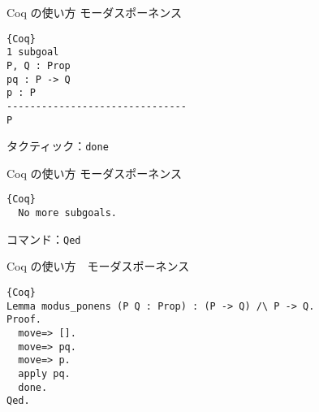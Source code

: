 \documentclass[dvipdfmx,cjk]{beamer}
\theoremstyle{mystyle}
\newcommand{\0}{\textbf{0}}
\begin{document}
\begin{frame}[fragile]{Coq の使い方 モーダスポーネンス}
	\begin{screen}
	  \begin{lstlisting}{Coq}
1 subgoal
P, Q : Prop
pq : P -> Q
p : P
-------------------------------
P \end{lstlisting}
	\end{screen}
	タクティック：{\tt done}
\end{frame}

\begin{frame}[fragile]{Coq の使い方 モーダスポーネンス}
	\begin{screen}
	  \begin{lstlisting}{Coq}
  No more subgoals. \end{lstlisting}
	\end{screen}
	コマンド：{\tt Qed}
\end{frame}

\begin{frame}[fragile]{Coq の使い方　モーダスポーネンス}
	\begin{lstlisting}{Coq}
Lemma modus_ponens (P Q : Prop) : (P -> Q) /\ P -> Q.
Proof.
  move=> [].
  move=> pq.
  move=> p.
  apply pq.
  done.
Qed. \end{lstlisting}
\end{frame}
\end{document}
